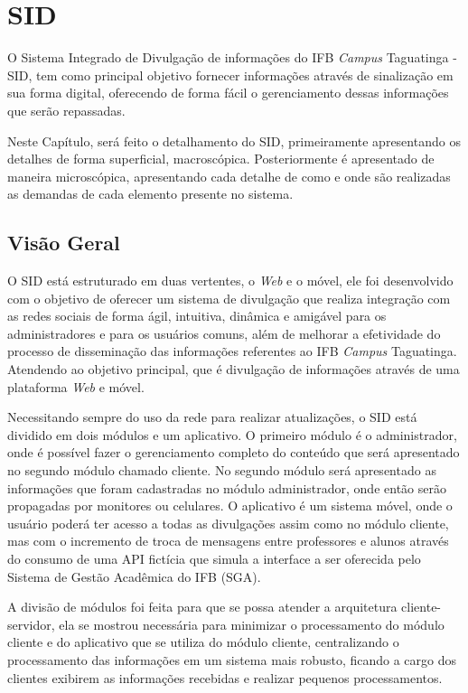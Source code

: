 \chapter[SID]{SID}
\label{cap:sid}
O Sistema Integrado de Divulgação de informações do IFB \textit{Campus} Taguatinga - SID, tem como principal objetivo fornecer informações através de sinalização em sua forma digital, oferecendo de forma fácil o gerenciamento dessas informações que serão repassadas. 

Neste Capítulo, será feito o detalhamento do SID, primeiramente apresentando os detalhes de forma superficial, macroscópica. Posteriormente é apresentado de maneira microscópica, apresentando cada detalhe de como e onde são realizadas as demandas de cada elemento presente no sistema. 

\section{Visão Geral} 
O SID está estruturado em duas vertentes, o \textit{Web} e o móvel, ele foi desenvolvido com o objetivo de oferecer um sistema de divulgação que realiza integração com as redes sociais de forma ágil, intuitiva, dinâmica e amigável para os administradores e para os usuários comuns, além de melhorar a efetividade do processo de disseminação das informações referentes ao IFB \textit{Campus} Taguatinga. Atendendo ao objetivo principal, que é divulgação de informações através de uma plataforma \textit{Web} e móvel.

Necessitando sempre do uso da rede para realizar atualizações, o SID está dividido em dois módulos e um aplicativo. O primeiro módulo é o administrador, onde é possível fazer o gerenciamento completo do conteúdo que será apresentado no segundo módulo chamado cliente. No segundo módulo será apresentado as informações que foram cadastradas no módulo administrador, onde então serão propagadas por monitores ou celulares. O aplicativo é um sistema móvel, onde o usuário poderá ter acesso a todas as divulgações assim como no módulo cliente, mas com o incremento de troca de mensagens entre professores e alunos através do consumo de uma API fictícia que simula a interface a ser oferecida pelo Sistema de Gestão Acadêmica do IFB (SGA).

A divisão de módulos foi feita para que se possa atender a arquitetura cliente-servidor, ela se mostrou necessária para minimizar o processamento do módulo cliente e do aplicativo que se utiliza do módulo cliente, centralizando o processamento das informações em um sistema mais robusto, ficando a cargo dos clientes exibirem as informações recebidas e realizar pequenos processamentos.

